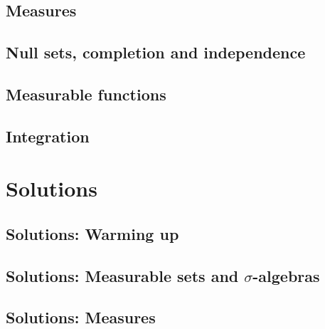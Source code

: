 \documentclass{easyclass}
\begin{document}
\chapter{Measures}



\chapter{Null sets, completion and independence}



\chapter{Measurable functions}



\chapter{Integration}




\part{Solutions}

\chapter{Solutions: Warming up}



\chapter{Solutions: Measurable sets and \texorpdfstring{$\sigma$}{}-algebras}



\chapter{Solutions: Measures}


\end{document}
